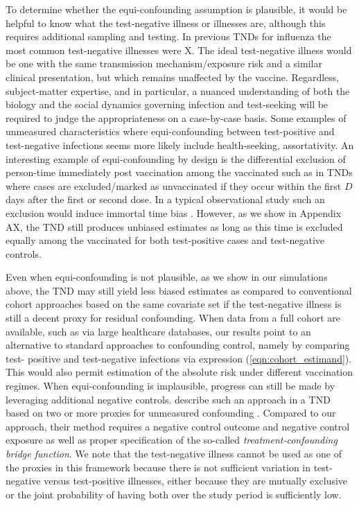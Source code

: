 \documentclass[11pt]{article}
\begin{document}
To determine whether the equi-confounding assumption is plausible, it would be helpful to know what the test-negative illness or illnesses are, although this requires additional sampling and testing. In previous TNDs for influenza the most common test-negative illnesses were X. The ideal test-negative illness would be one with the same transmission mechanism/exposure risk and a similar clinical presentation, but which remains unaffected by the vaccine. Regardless, subject-matter expertise, and in particular, a nuanced understanding of both the biology and the social dynamics governing infection and test-seeking will be required to judge the appropriateness on a case-by-case basis. Some examples of unmeasured characteristics where equi-confounding between test-positive and test-negative infections seems more likely include health-seeking, assortativity. An interesting example of equi-confounding by design is the differential exclusion of person-time immediately post vaccination among the vaccinated such as in TNDs where cases are excluded/marked as unvaccinated if they occur within the first $D$ days after the first or second dose. In a typical observational study such an exclusion would induce immortal time bias \cite{suissa_immortal_2008}. However, as we show in Appendix AX, the TND still produces unbiased estimates as long as this time is excluded equally among the vaccinated for both test-positive cases and test-negative controls. 

Even when equi-confounding is not plausible, as we show in our simulations above, the TND may still yield less biased estimates as compared to conventional cohort approaches based on the same covariate set if the test-negative illness is still a decent proxy for residual confounding. When data from a full cohort are available, such as via large healthcare databases, our results point to an alternative to standard approaches to confounding control, namely by comparing test- positive and test-negative infections via expression (\ref{eqn:cohort_estimand}). This would also permit estimation of the absolute risk under different vaccination regimes. When equi-confounding is implausible, progress can still be made by leveraging additional negative controls. \citeauthor{li_double_2023} describe such an approach in a TND based on two or more proxies for unmeasured confounding \cite{li_double_2023}. Compared to our approach, their method requires a negative control outcome and negative control exposure as well as proper specification of the so-called \textit{treatment-confounding bridge function}. We note that the test-negative illness cannot be used as one of the proxies in this framework because there is not sufficient variation in test-negative versus test-positive illnesses, either because they are mutually exclusive or the joint probability of having both over the study period is sufficiently low.
\end{document}
